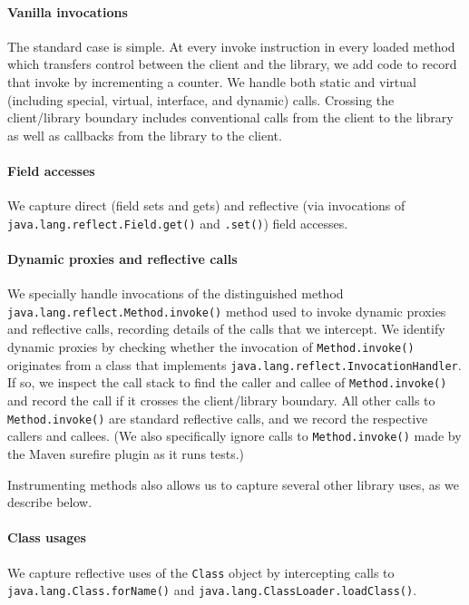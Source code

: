 \paragraph{Vanilla invocations}
The standard case is simple. At every invoke instruction in every
loaded method which transfers control between the client and the
library, we add code to record that invoke by incrementing a counter.
We handle both static and virtual (including special, virtual,
interface, and dynamic) calls. Crossing the client/library boundary
includes conventional calls from the client to the library as well as callbacks from the library to the client.  

\paragraph{Field accesses}
We capture direct (field sets and gets) and reflective (via invocations of
\texttt{java.lang.reflect.Field.get()} and \texttt{.set()}) field
accesses.

\paragraph{Dynamic proxies and reflective calls}
We specially handle invocations of the distinguished method 
\texttt{java.lang.reflect.Method.invoke()} method used to invoke dynamic proxies and reflective calls, recording
details of the calls that we intercept. 
We identify dynamic proxies by checking whether the invocation 
of \texttt{Method.invoke()} originates from a class that implements 
\texttt{java.lang.reflect.InvocationHandler}. If so,
we inspect the call stack to find the caller and callee of 
\texttt{Method.invoke()} and record the call if it crosses the client/library boundary. 
All other calls to \texttt{Method.invoke()} are standard reflective calls, 
and we record the respective callers and callees.
(We also specifically ignore calls to \texttt{Method.invoke()} made by the Maven surefire plugin
as it runs tests.)

Instrumenting methods also allows us to capture several other library uses,
as we describe below.

\paragraph{Class usages}
We capture reflective uses of the \texttt{Class} object by intercepting calls to
\texttt{java.lang.Class.forName()} and \texttt{java.lang.ClassLoader.loadClass()}.

